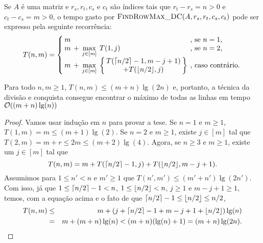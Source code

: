 Se $A$ é uma matriz e $r_s,r_t,c_s$ e $c_t$ são índices tais que $r_t-r_s = n > 0$ e $c_t-c_s = m > 0$, o tempo gasto por $\textsc{FindRowMax\_DC}(A,r_s,r_t,c_s,c_t)$ pode ser expresso pela seguinte recorrência:
\begin{equation*}
\arraycolsep=2pt
T(n,m) = \left\{
\begin{array}{lllll}
    m &   &                         &                         & \text{, se } n = 1 \text{,} \\
    m & + & \max\limits_{j \in [m]} & T(1,j)                  & \text{, se } n = 2 \text{,} \\[2pt]
    m & + & \max\limits_{j \in [m]} & \left\{\begin{array}{c}
     T(\ceil{n/2}-1,m-j+1) \\
     + T(\floor{n/2},j)    \\
    \end{array} \right\}                                      & \text{, caso contrário.} \\
\end{array}
\right.
\end{equation*}

\begin{prop}
Para todo $n,m \geq 1$, $T(n,m) \leq (m+n)\lg(2n)$ e, portanto, a técnica da divisão e conquista consegue encontrar o máximo de todas as linhas em tempo $\mathcal{O}((m+n)\lg(n))$
\end{prop}

\begin{proof}
Vamos usar indução em $n$ para provar a tese. Se $n = 1$ e $m \geq 1$, $T(1,m) = m \leq (m+1)\lg(2)$. Se $n = 2$ e $m \geq 1$, existe $j \in [m]$ tal que $T(2,m) = m + r \leq 2m \leq (m+2)\lg(4)$. Agora, se $n \geq 3$ e $m \geq 1$, existe um $j \in [m]$ tal que 
$$ T(n,m) = m + T(\lceil n/2\rceil - 1, j) + T(\lfloor n/2\rfloor, m - j + 1). $$
Assumimos para $1 \leq n' < n$ e $m' \geq 1$ que $T(n',m') \leq (m'+n')\lg(2n')$. Com isso, já que $1 \leq \lceil n/2\rceil-1 < n$, $1 \leq \lfloor n/2\rfloor < n$, $j \geq 1$ e $m - j + 1 \geq 1$, temos, com a equação acima e o fato de que $\lceil n/2\rceil-1 \leq \lfloor n/2\rfloor \leq n/2$,
\begin{eqnarray*} 
    T(n,m) & \leq & m + (j + \lceil n/2\rceil - 1 + m - j + 1 + \lfloor n/2\rfloor)\lg(n) \\
           & =    & m + (m + n)\lg(n) < (m + n)(\lg(n) + 1) = (m + n)\lg(2n).
\end{eqnarray*}
\end{proof}

